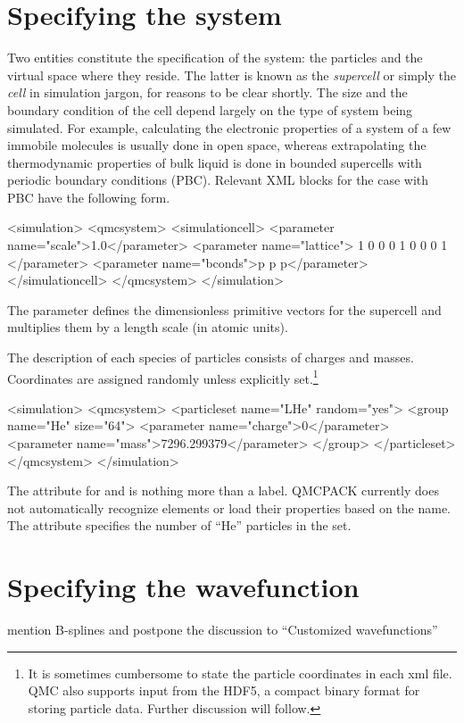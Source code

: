 \section{Specifying the system}
Two entities constitute the specification of the system: the particles and the virtual space where they reside.  The latter is known as the \emph{supercell} or simply the \emph{cell} in simulation jargon, for reasons to be clear shortly.  The size and the boundary condition of the cell depend largely on the type of system being simulated.  For example, calculating the electronic properties of a system of a few immobile molecules is usually done in open space, whereas extrapolating the thermodynamic properties of bulk liquid is done in bounded supercells with periodic boundary conditions (PBC).  Relevant XML blocks for the case with PBC have the following form.
\begin{code}
<simulation>
  <qmcsystem>
    <simulationcell>
      <parameter name="scale">1.0</parameter>
      <parameter name="lattice">
        1 0 0
        0 1 0
        0 0 1
      </parameter>
      <parameter name="bconds">p p p</parameter>
    </simulationcell>
  </qmcsystem>
</simulation>
\end{code}
The  parameter defines the dimensionless primitive vectors for the supercell and  multiplies them by a length scale (in atomic units).

The description of each species of particles consists of charges and masses.  Coordinates are assigned randomly unless explicitly set.\footnote{It is sometimes cumbersome to state the particle coordinates in each xml file.  QMC also supports input from the HDF5, a compact binary format for storing particle data.  Further discussion will follow.}  
\begin{code}
<simulation>
  <qmcsystem>
    <particleset name="LHe" random="yes">
      <group name="He" size="64">
        <parameter name="charge">0</parameter>
        <parameter name="mass">7296.299379</parameter>
      </group>
    </particleset>
  </qmcsystem>
</simulation>
\end{code}
The  attribute for  and  is nothing more than a label.  QMCPACK currently does not automatically recognize elements or load their properties based on the name.  The  attribute specifies the number of ``He'' particles in the set.
\section{Specifying the wavefunction}
mention B-splines and postpone the discussion to ``Customized wavefunctions''
